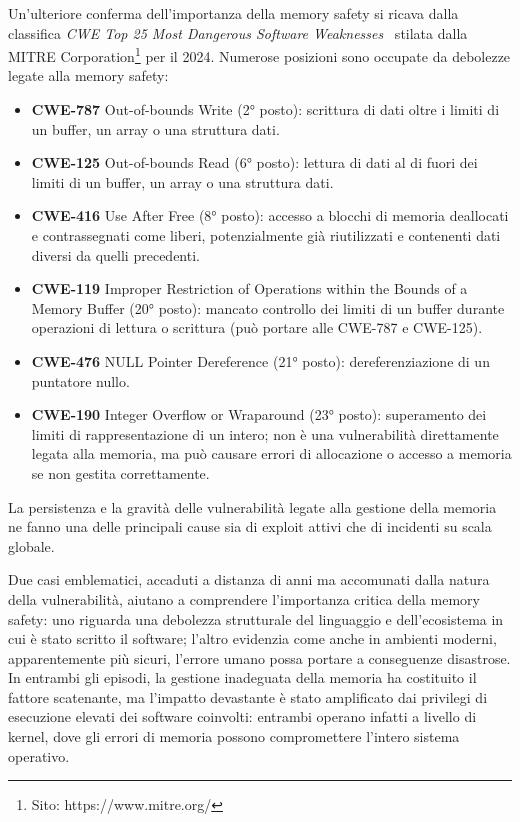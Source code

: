 Un'ulteriore conferma dell'importanza della memory safety si ricava dalla
classifica \textit{CWE Top 25 Most Dangerous Software Weaknesses}~\cite{cwe_top25_2024}
stilata dalla MITRE Corporation\footnote{Sito: https://www.mitre.org/} per il 2024.
Numerose posizioni sono occupate da debolezze legate alla memory safety:
\begin{itemize}
  \item \textbf{CWE-787} Out-of-bounds Write (2° posto): scrittura di dati oltre
    i limiti di un buffer, un array o una struttura dati.

  \item \textbf{CWE-125} Out-of-bounds Read (6° posto): lettura di dati al di fuori
    dei limiti di un buffer, un array o una struttura dati.

  \item \textbf{CWE-416} Use After Free (8° posto): accesso a blocchi di memoria
    deallocati e contrassegnati come liberi, potenzialmente già riutilizzati e
    contenenti dati diversi da quelli precedenti.

  \item \textbf{CWE-119} Improper Restriction of Operations within the Bounds of
    a Memory Buffer (20° posto): mancato controllo dei limiti di un buffer durante
    operazioni di lettura o scrittura (può portare alle CWE-787 e CWE-125).

  \item \textbf{CWE-476} NULL Pointer Dereference (21° posto): dereferenziazione
    di un puntatore nullo.

  \item \textbf{CWE-190} Integer Overflow or Wraparound (23° posto): superamento
    dei limiti di rappresentazione di un intero; non è una vulnerabilità
    direttamente legata alla memoria, ma può causare errori di allocazione o accesso
    a memoria se non gestita correttamente.
\end{itemize}
La persistenza e la gravità delle vulnerabilità legate alla gestione della
memoria ne fanno una delle principali cause sia di exploit attivi che di
incidenti su scala globale.

\bigskip
\noindent
Due casi emblematici, accaduti a distanza di anni ma accomunati dalla natura della
vulnerabilità, aiutano a comprendere l'importanza critica della memory safety: uno
riguarda una debolezza strutturale del linguaggio e dell'ecosistema in cui è stato
scritto il software; l'altro evidenzia come anche in ambienti moderni, apparentemente
più sicuri, l'errore umano possa portare a conseguenze disastrose. In entrambi gli
episodi, la gestione inadeguata della memoria ha costituito il fattore
scatenante, ma l'impatto devastante è stato amplificato dai privilegi di esecuzione
elevati dei software coinvolti: entrambi operano infatti a livello di kernel, dove
gli errori di memoria possono compromettere l'intero sistema operativo.

